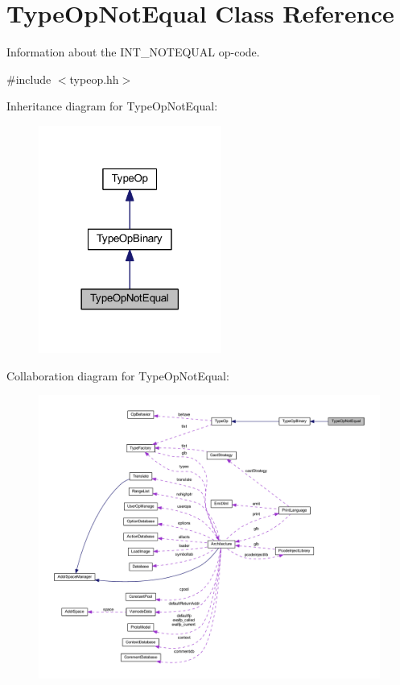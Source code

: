 \hypertarget{class_type_op_not_equal}{}\section{Type\+Op\+Not\+Equal Class Reference}
\label{class_type_op_not_equal}


Information about the I\+N\+T\+\_\+\+N\+O\+T\+E\+Q\+U\+AL op-\/code.  




{\ttfamily \#include $<$typeop.\+hh$>$}



Inheritance diagram for Type\+Op\+Not\+Equal\+:
\nopagebreak
\begin{figure}[H]
\begin{center}
\leavevmode
\includegraphics[width=170pt]{class_type_op_not_equal__inherit__graph}
\end{center}
\end{figure}


Collaboration diagram for Type\+Op\+Not\+Equal\+:
\nopagebreak
\begin{figure}[H]
\begin{center}
\leavevmode
\includegraphics[width=350pt]{class_type_op_not_equal__coll__graph}
\end{center}
\end{figure}
